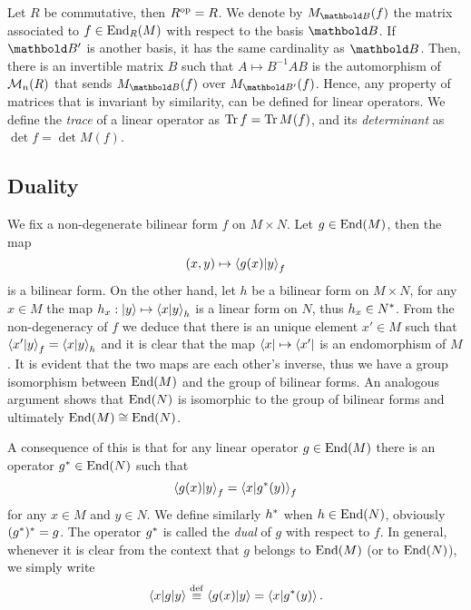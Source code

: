 Let $R$ be commutative, then $R^{\mathrm{op}} = R$. We denote by
$M_{\basis{B}}(f)$ the matrix associated to $f\in\operatorname{End}_R(M)$ with
respect to the basis $\basis{B}$.  If $\basis{B'}$ is another basis,
it has the same cardinality as $\basis{B}$. Then, there is an
invertible matrix $B$ such that $A\mapsto B^{-1}AB$ is the
automorphism of $\operatorname{\mathcal{M}}_n(R)$ that sends $M_{\basis{B}}(f)$ over
$M_{\basis{B'}}(f)$. Hence, any property of matrices that is invariant
by similarity, can be defined for linear operators. We define the
 \textit{trace} of a linear
operator as $\operatorname{Tr} f = \operatorname{Tr} M(f)$, and its
\textit{determinant} as $\det f = \det
M(f)$.


\subsection{Duality}
\label{sec:linear-algebra:duality}
We fix a non-degenerate bilinear form $f$ on $M\times N$. Let
$g\in\operatorname{End}(M)$, then the map
\[(x,y) \mapsto \left\langle g(x) \middle| y \right\rangle_f\] is a bilinear form. On the other
hand, let $h$ be a bilinear form on $M\times N$, for any $x\in M$ the
map $h_x : \left\lvert y \right\rangle \mapsto \left\langle x \middle| y \right\rangle_h$ is a linear form on $N$,
thus $h_x\in N^\ast$. From the non-degeneracy of $f$ we deduce that
there is an unique element $x'\in M$ such that
$\left\langle x' \middle| y \right\rangle_f=\left\langle x \middle| y \right\rangle_h$ and it is clear that the map
$\left\langle x \right\rvert\mapsto \left\langle x' \right\rvert$ is an endomorphism of $M$. It is evident
that the two maps are each other's inverse, thus we have a group
isomorphism between $\operatorname{End}(M)$ and the group of bilinear forms. An
analogous argument shows that $\operatorname{End}(N)$ is isomorphic to the group of
bilinear forms and ultimately $\operatorname{End}(M)\cong\operatorname{End}(N)$.

A consequence of this is that for any linear operator $g\in\operatorname{End}(M)$
there is an operator $g^\ast\in\operatorname{End}(N)$ such that
\[\left\langle g(x) \middle| y \right\rangle_f = \left\langle x \middle| g^\ast(y) \right\rangle_f\]
for any $x\in M$ and $y\in N$. We define similarly $h^\ast$ when
$h\in\operatorname{End}(N)$, obviously $(g^\ast)^\ast = g$. The operator
$g^\ast$ is called the
\textit{dual} of $g$ with
respect to $f$. In general, whenever it is clear from the context that
$g$ belongs to $\operatorname{End}(M)$ (or to $\operatorname{End}(N)$), we simply
write
\[\left\langle x \middle| g \middle| y \right\rangle \overset{\mathrm{def}}{\equiv} \left\langle g(x) \middle| y \right\rangle = \left\langle x \middle| g^\ast(y) \right\rangle\text{.}\]

